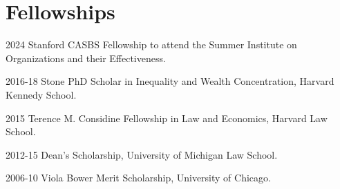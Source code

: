     \section*{Fellowships}
    
    \begin{tablist}
        \item[2024] \tab{} Stanford CASBS Fellowship to attend the Summer Institute on Organizations and their Effectiveness.
    \item[2016-18] \tab{}Stone PhD Scholar in Inequality and Wealth Concentration, Harvard Kennedy School.
    \item[2015] \tab{}Terence M. Considine Fellowship in Law and Economics, Harvard Law School.
    \item[2012-15] \tab{}Dean's Scholarship, University of Michigan Law School.
    \item[2006-10] \tab{}Viola Bower Merit Scholarship, University of Chicago.
    \end{tablist}

	